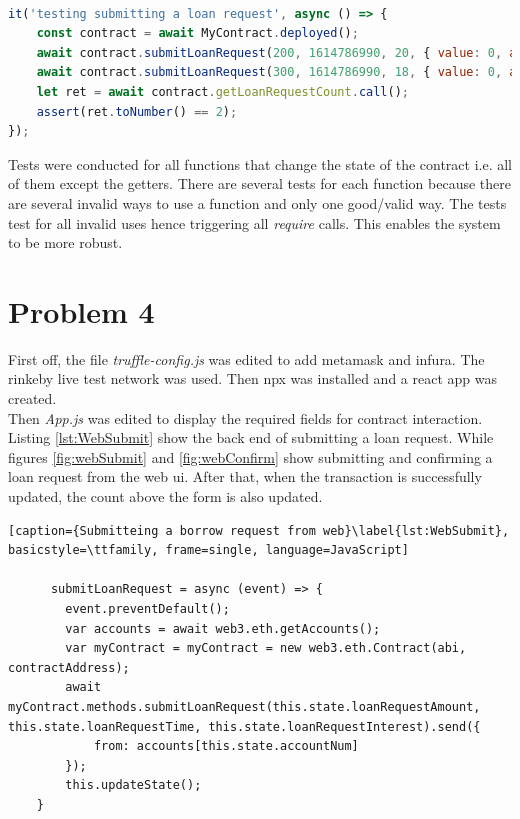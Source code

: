 \documentclass[a4paper, 12pt]{article}
\begin{document}
\begin{lstlisting}[caption={Borrower submitting a load request}, basicstyle=\ttfamily, frame=single, language=JavaScript]
  
it('testing submitting a loan request', async () => {
	const contract = await MyContract.deployed();
	await contract.submitLoanRequest(200, 1614786990, 20, { value: 0, account: borrower });
	await contract.submitLoanRequest(300, 1614786990, 18, { value: 0, account: borrower });
	let ret = await contract.getLoanRequestCount.call();
	assert(ret.toNumber() == 2);
});

\end{lstlisting}

Tests were conducted for all functions that change the state of the contract i.e. all of them except the getters.
There are several tests for each function because there are several invalid ways to use a function and only one good/valid way. The tests test for all invalid uses hence triggering all \textit{require} calls. This enables the system to be more robust.

\section{Problem 4}
First off, the file \textit{truffle-config.js} was edited to add metamask and infura. The rinkeby live test network was used. Then npx was installed and a react app was created. 
\\

Then \textit{App.js} was edited to display the required fields for contract interaction. Listing \ref{lst:WebSubmit} show the back end of submitting a loan request. While figures \ref{fig:webSubmit} and \ref{fig:webConfirm} show submitting and confirming a loan request from the web ui. After that, when the transaction is successfully updated, the count above the form is also updated.

\begin{lstlisting}[caption={Submitteing a borrow request from web}\label{lst:WebSubmit}, basicstyle=\ttfamily, frame=single, language=JavaScript]
	
	  submitLoanRequest = async (event) => {
		event.preventDefault();
		var accounts = await web3.eth.getAccounts();
		var myContract = myContract = new web3.eth.Contract(abi, contractAddress);
		await myContract.methods.submitLoanRequest(this.state.loanRequestAmount, this.state.loanRequestTime, this.state.loanRequestInterest).send({
			from: accounts[this.state.accountNum]
		});
		this.updateState();
	}
	
\end{lstlisting}
\end{document}
